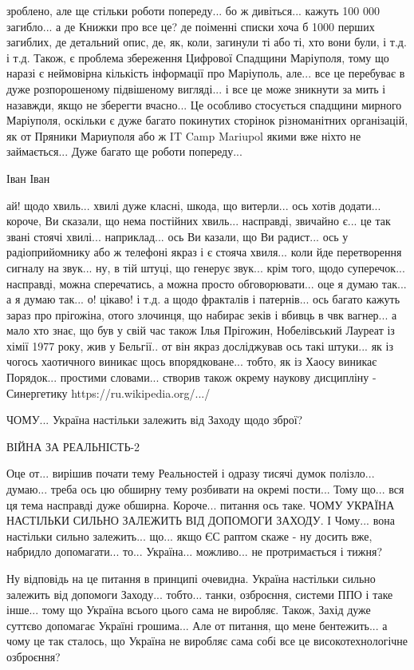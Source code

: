 зроблено, але ще стільки роботи попереду... бо ж дивіться... кажуть 100 000
загибло... а де Книжки про все це? де поіменні списки хоча б 1000 перших
загиблих, де детальний опис, де, як, коли, загинули ті або ті, хто вони були, і
т.д. і т.д. Також, є проблема збереження Цифрової Спадщини Маріуполя, тому що
наразі є неймовірна кількість інформації про Маріуполь, але... все це перебуває
в дуже розпорошеному підвішеному вигляді... і все це може зникнути за мить і
назавжди, якщо не зберегти вчасно... Це особливо стосується спадщини мирного
Маріуполя, оскільки є дуже багато покинутих сторінок різноманітних організацій,
як от Пряники Мариуполя або ж IT Camp Mariupol якими вже ніхто не займається...
Дуже багато ще роботи попереду...

Іван Іван

ай! щодо хвиль... хвилі дуже класні, шкода, що витерли... ось хотів додати...
короче, Ви сказали, що нема постійних хвиль... насправді, звичайно є... це так
звані стоячі хвилі... наприклад... ось Ви казали, що Ви радист... ось у
радіоприйомнику або ж телефоні якраз і є стояча хвиля... коли йде перетворення
сигналу на звук... ну, в тій штуці, що генерує звук... крім того, щодо
суперечок... насправді, можна сперечатись, а можна просто обговорювати... оце я
думаю так... а я думаю так... о! цікаво! і т.д. а щодо фракталів і патернів...
ось багато кажуть зараз про прігожіна, отого злочинця, що набирає зеків і
вбивць в чвк вагнер... а мало хто знає, що був у свій час також Ілья Прігожин,
Нобелівський Лауреат із хімії 1977 року, жив у Бельгії.. от він якраз
досліджував ось такі штуки... як із чогось хаотичного виникає щось
впорядковане... тобто, як із Хаосу виникає Порядок... простими словами...
створив також окрему наукову дисципліну - Синергетику
https://ru.wikipedia.org/.../%

ЧОМУ... Україна настільки залежить від Заходу щодо зброї?

ВІЙНА ЗА РЕАЛЬНІСТЬ-2

Оце от... вирішив почати тему Реальностей і одразу тисячі думок полізло...
думаю... треба ось цю обширну тему розбивати на окремі пости... Тому що... вся
ця тема насправді дуже обширна. Короче... питання ось таке. ЧОМУ УКРАЇНА
НАСТІЛЬКИ СИЛЬНО ЗАЛЕЖИТЬ ВІД ДОПОМОГИ ЗАХОДУ. І Чому... вона настільки сильно
залежить... що... якщо ЄС раптом скаже - ну досить вже, набридло допомагати...
то... Україна... можливо... не протримається і тижня?  

Ну відповідь на це питання в принципі очевидна. Україна настільки сильно
залежить від допомоги Заходу... тобто... танки, озброєння, системи ППО і таке
інше... тому що Україна всього цього сама не виробляє. Також, Захід дуже
суттєво допомагає Україні грошима... Але от питання, що мене бентежить... а
чому це так сталось, що Україна не виробляє сама собі все це високотехнологічне
озброєння?

